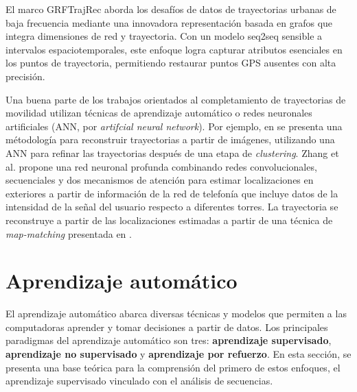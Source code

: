El marco GRFTrajRec \cite{zhaograph} aborda los desafíos de datos de trayectorias urbanas de baja frecuencia mediante una innovadora representación basada en grafos que integra dimensiones de red y trayectoria. Con un modelo seq2seq sensible a intervalos espaciotemporales, este enfoque logra capturar atributos esenciales en los puntos de trayectoria, permitiendo restaurar puntos GPS ausentes con alta precisión.

Una buena parte de los trabajos orientados al completamiento de trayectorias de movilidad utilizan técnicas de aprendizaje automático o redes neuronales artificiales (ANN, por \textit{artifcial neural network}). Por ejemplo, en \cite{partsinevelos2005reconstructing} se presenta una métodología para reconstruir trayectorias a partir de imágenes, utilizando una ANN para refinar las trayectorias después de una etapa de \textit{clustering}. Zhang et al. \cite{zhang2019prnet} propone una red neuronal profunda combinando redes convolucionales, secuenciales y dos mecanismos de atención para estimar localizaciones en exteriores a partir de información de la red de telefonía que incluye datos de la intensidad de la señal del usuario respecto a diferentes torres. La trayectoria se reconstruye a partir de las localizaciones estimadas a partir de una técnica de \textit{map-matching} presentada en \cite{zheng2014urban}.



\section{Aprendizaje automático}

El aprendizaje automático abarca diversas técnicas y modelos que permiten a las computadoras aprender y tomar decisiones a partir de datos. Los principales paradigmas del aprendizaje automático son tres: \textbf{aprendizaje supervisado}, \textbf{aprendizaje no supervisado} y \textbf{aprendizaje por refuerzo}. En esta sección, se presenta una base teórica para la comprensión del primero de estos enfoques, el aprendizaje supervisado vinculado con el análisis de secuencias.

